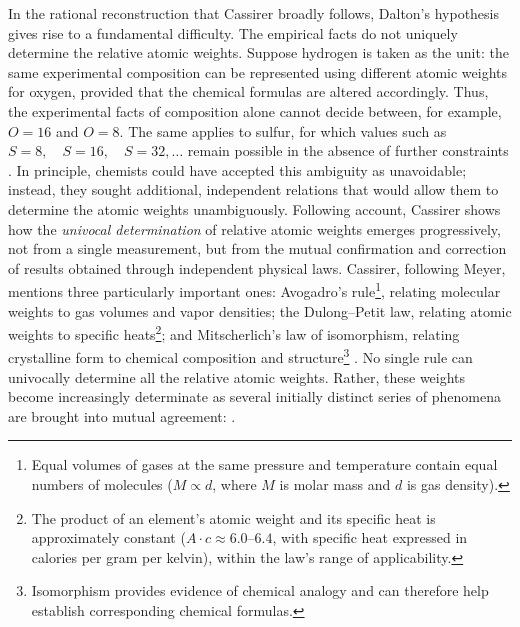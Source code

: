 In the rational reconstruction that Cassirer broadly follows, Dalton's hypothesis gives rise to a fundamental difficulty. The empirical facts do not uniquely determine the relative atomic weights. Suppose hydrogen is taken as the unit: the same experimental composition can be represented using different atomic weights for oxygen, provided that the chemical formulas are altered accordingly. Thus, the experimental facts of composition alone cannot decide between, for example, $O=16$ and $O=8$. The same applies to sulfur, for which values such as $S=8, \quad S=16, \quad S=32, \ldots$ remain possible in the absence of further constraints . In principle, chemists could have accepted this ambiguity as unavoidable; instead, they sought additional, independent relations that would allow them to determine the atomic weights unambiguously. Following  account, Cassirer shows how the \emph{univocal determination} of relative atomic weights emerges progressively, not from a single measurement, but from the mutual confirmation and correction of results obtained through independent physical laws. Cassirer, following Meyer, mentions three particularly important ones: Avogadro's rule\footnote{Equal volumes of gases at the same pressure and temperature contain equal numbers of molecules ($M \propto d$, where $M$ is molar mass and $d$ is gas density).}, relating molecular weights to gas volumes and vapor densities; the Dulong--Petit law, relating atomic weights to specific heats\footnote{The product of an element's atomic weight and its specific heat is approximately constant ($A \cdot c \approx 6.0\text{–}6.4$, with specific heat expressed in calories per gram per kelvin), within the law's range of applicability.}; and Mitscherlich's law of isomorphism, relating crystalline form to chemical composition and structure\footnote{Isomorphism provides evidence of chemical analogy and can therefore help establish corresponding chemical formulas.} . No single rule can univocally determine all the relative atomic weights. Rather, these weights become increasingly determinate as several initially distinct series of phenomena are brought into mutual agreement:  .

